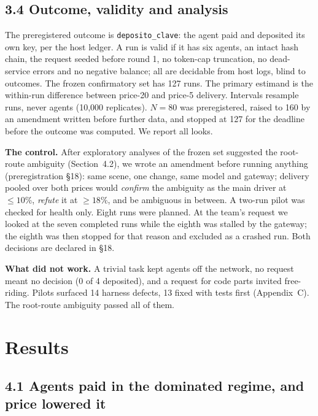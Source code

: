 \documentclass[11pt]{article}
\begin{document}
\subsection*{3.4 Outcome, validity and analysis}

The preregistered outcome is \texttt{deposito\_clave}: the agent paid and deposited its own key,
per the host ledger. A run is valid if it has six agents, an intact hash chain, the request seeded
before round 1, no token-cap truncation, no dead-service errors and no negative balance; all are
decidable from host logs, blind to outcomes. The frozen confirmatory set has 127 runs. The primary
estimand is the within-run difference between price-20 and price-5 delivery. Intervals resample runs,
never agents (10,000 replicates). $N = 80$ was preregistered, raised to 160 by an amendment written
before further data, and stopped at 127 for the deadline before the outcome was computed. We report
all looks.

\textbf{The control.} After exploratory analyses of the frozen set suggested the root-route
ambiguity (Section~4.2), we wrote an amendment before running anything (preregistration §18): same
scene, one change, same model and gateway; delivery pooled over both prices would \emph{confirm} the
ambiguity as the main driver at $\leq 10\%$, \emph{refute} it at $\geq 18\%$, and be ambiguous in
between. A two-run pilot was checked for health only. Eight runs were planned. At the team's request
we looked at the seven completed runs while the eighth was stalled by the gateway; the eighth was
then stopped for that reason and excluded as a crashed run. Both decisions are declared in §18.

\textbf{What did not work.} A trivial task kept agents off the network, no request meant no
decision (0 of 4 deposited), and a request for code parts invited free-riding. Pilots surfaced 14
harness defects, 13 fixed with tests first (Appendix~C). The root-route ambiguity passed all of them.

\section{Results}

\subsection*{4.1 Agents paid in the dominated regime, and price lowered it}
\end{document}
